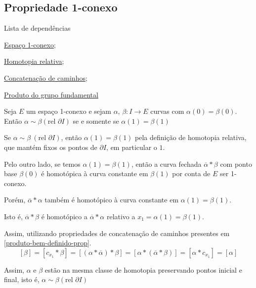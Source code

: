 \subsection{Propriedade 1-conexo} %
\label{1-conexo-prop}
\begin{titlemize}{Lista de dependências}
	\item \hyperref[espaço-1-conexo-def]{Espaço 1-conexo};\\ %
	\item \hyperref[homotopia-relativa-def]{Homotopia relativa};\\
        \item \hyperref[Produto-concatenacao-def]{Concatenação de caminhos};\\
        \item  \hyperref[produto-bem-definido-prop]{Produto do grupo fundamental}
\end{titlemize}




\begin{prop}%
	Seja $E$ um espaço 1-conexo e sejam $\alpha$, $\beta: I\rightarrow E$ curvas com $\alpha(0)=\beta(0)$. Então $\alpha \sim \beta (\text{rel }\partial I)$ se e somente se $\alpha(1)=\beta(1)$\\
\end{prop}
\begin{dem}
    Se $\alpha \sim \beta ~(\text{rel }\partial I)$, então $\alpha(1)=\beta(1)$ pela definição de homotopia relativa, que mantém fixos os pontos de $\partial I$, em particular o $1$.

    Pelo outro lado, se temos $\alpha(1)=\beta(1)$, então a curva fechada $\overline{\alpha}* \beta$ com ponto base $\beta(0)$ é homotópica à curva constante em $\beta(1)$ por conta de $E$ ser 1-conexo.
    
    Porém, $\overline{\alpha}*\alpha$ também é homotópico à curva constante em $\alpha(1)=\beta(1)$. 
    
    Isto é, $\overline{\alpha}* \beta$ é homotópico a $\overline{\alpha}*\alpha$ relativo a $x_1=\alpha(1)=\beta(1)$.

    Assim, utilizando propriedades de concatenação de caminhos presentes em \ref{produto-bem-definido-prop}.
   $$[\beta]=[c_{x_1}*\beta]=[(\alpha * \overline{\alpha}) *\beta]=[\alpha*(\overline{\alpha}*\beta)]=[\alpha * c_{x_1}]=[\alpha]$$

   Assim, $\alpha$ e $\beta$ estão na mesma classe de homotopia preservando pontos inicial e final, isto é, $\alpha \sim \beta (\text{rel }\partial I)$
\end{dem}

